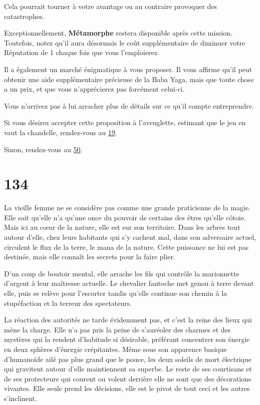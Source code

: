\documentclass{report}
\newcommand{\gsection}[1]{
    \section{#1}
    \label{section-#1}
}
\newcommand{\glink}[1]{\hyperref[section-#1]{#1}}
\newcommand{\hero}[1]{\textbf{#1}}
\begin{document}
Cela pourrait tourner à votre avantage ou au contraire provoquer des catastrophes.

Exceptionnellement, \hero{Métamorphe} restera disponible après cette mission. Toutefois, notez qu'il aura désormais le coût supplémentaire de diminuer votre Réputation de 1 chaque fois que vous l'emploierez.

Il a également un marché énigmatique à vous proposer. Il vous affirme qu'il peut obtenir une aide supplémentaire précieuse de la Baba Yaga, mais que toute chose a un prix, et que vous n'apprécierez pas forcément celui-ci.

Vous n'arrivez pas à lui arracher plus de détails sur ce qu'il compte entreprendre.

Si vous désirez accepter cette proposition à l'aveuglette, estimant que le jeu en vaut la chandelle, rendez-vous au \glink{19}.

Sinon, rendez-vous au \glink{50}.

\gsection{134}

La vieille femme ne se considère pas comme une grande praticienne de la magie. Elle sait qu'elle n'a qu'une once du pouvoir de certains des êtres qu'elle côtoie. Mais ici au cœur de la nature, elle est sur son territoire. Dans les arbres tout autour d'elle, chez leurs habitants qui s'y cachent mal, dans son adversaire actuel, circulent le flux de la terre, le mana de la nature. Cette puissance ne lui est pas destinée, mais elle connaît les secrets pour la faire plier.

D'un coup de boutoir mental, elle arrache les fils qui contrôle la marionnette d'argent à leur maîtresse actuelle. Le chevalier fantoche met genou à terre devant elle, puis se relève pour l'escorter tandis qu'elle continue son chemin à la stupéfaction et la terreur des spectateurs.

La réaction des autorités ne tarde évidemment pas, et c'est la reine des lieux qui mène la charge. Elle n'a pas pris la peine de s'auréoler des charmes et des mystères qui la rendent d'habitude si désirable, préférant concentrer son énergie en deux sphères d'énergie crépitantes. Même sous son apparence basique d'humanoïde ailé pas plus grand que le pouce, les deux soleils de mort électrique qui gravitent autour d'elle maintiennent sa superbe. Le reste de ses courtisans et de ses protecteurs qui courent ou volent derrière elle ne sont que des décorations vivantes. Elle seule prend les décisions, elle est le pivot de tout ceci et les autres s'inclinent.
\end{document}
